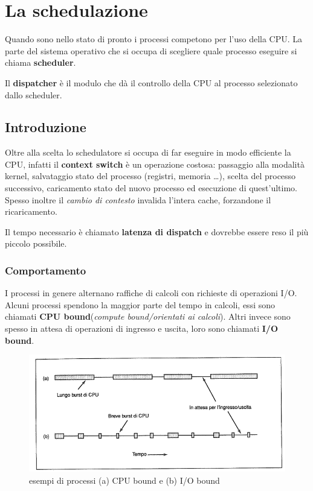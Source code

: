 \chapter{La schedulazione}
\thispagestyle{empty}
Quando sono nello stato di pronto i processi competono per l'uso della CPU.
La parte del sistema operativo che si occupa di scegliere quale processo eseguire si chiama \textbf{scheduler}.

Il \textbf{dispatcher} è il modulo che dà il controllo della CPU al processo selezionato dallo scheduler.

\section{Introduzione}
Oltre alla scelta lo schedulatore si occupa di far eseguire in modo efficiente la CPU, infatti il \textbf{context switch} è un operazione costosa: passaggio alla modalità kernel, salvataggio stato del processo (registri, memoria \dots), scelta del processo successivo, caricamento stato del nuovo processo ed esecuzione di quest'ultimo. Spesso inoltre il \textit{cambio di contesto} invalida l'intera cache, forzandone il ricaricamento.

Il tempo necessario è chiamato \textbf{latenza di dispatch} e dovrebbe essere reso il più piccolo possibile.

\subsection{Comportamento}
I processi in genere alternano raffiche di calcoli con richieste di operazioni I/O.
Alcuni processi spendono la maggior parte del tempo in calcoli, essi sono chiamati \textbf{CPU bound}(\textit{compute bound/orientati ai calcoli}).
Altri invece sono spesso in attesa di operazioni di ingresso e uscita, loro sono chiamati \textbf{I/O bound}.

\begin{figure}
    \centering
    \includegraphics[width=0.6\linewidth]{assets/bound4.png}
    \caption{esempi di processi (a) CPU bound e (b) I/O bound}
\end{figure}

